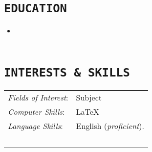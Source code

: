 \documentclass{cls/Curriculum_Vitae_Class}
\begin{document}

\section{\texttt{EDUCATION}}
\begin{itemize}
	\item {}\\~\\
\end{itemize}


\section{\texttt{INTERESTS \& SKILLS}}
\begin{tabular}{ l l }
 \textit{Fields of Interest}: & Subject \\ [0.5em]
 \textit{Computer Skills}: & \LaTeX \\ [0.5em]
 \textit{Language Skills}: & English (\textit{proficient}).\\~\\
\end{tabular}

\end{document}
